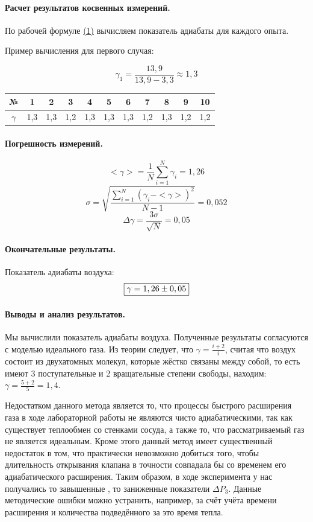 \documentclass{article}
\begin{document}
\paragraph{Расчет результатов косвенных измерений.}
	По рабочей формуле \hyperlink{formuls}{(1)} вычисляем показатель адиабаты для каждого опыта.
	
	Пример вычисления для первого случая:
	
	$$\gamma_1=\frac{13,9}{13,9-3,3}\approx1,3$$ 
	
		\begin{center}
		\begin{tabular}{c|c| c |c |c |c |c |c |c| c| c|  }
			№&1&2&3&4&5&6&7	&8&9&10\\
			\hline
			$\gamma$& 1,3 & 1,3& 1,2& 1,3& 1,3& 1,3& 1,2& 1,3& 1,2& 1,2
		\end{tabular}
	\end{center}
\paragraph{Погрешность измерений.}
$$<\gamma>=\frac{1}{N}\sum_{i=1}^{N}\gamma_i=1,26$$
$$\sigma=\sqrt{\frac{\sum_{i=1}^{N}(\gamma_i-<\gamma>)^2}{N-1}}=0,052$$
$$ \Delta\gamma=\frac{3\sigma}{\sqrt{N}}=0,05$$

 
\paragraph{Окончательные результаты.}
Показатель адиабаты воздуха:
$$\fbox{$\gamma=1,26\pm0,05$} $$
\paragraph{Выводы и анализ результатов.}
Мы вычислили показатель адиабаты воздуха. Полученные результаты согласуются с моделью идеального газа. Из теории следует, что  $\gamma=\frac{i+2}{i}$, считая что воздух состоит из двухатомных молекул, которые жёстко связаны между собой, то есть имеют 3 поступательные и 2 вращательные степени свободы, находим: $\gamma=\frac{5+2}{5}=1,4$.

Недостатком данного метода является то, что процессы быстрого расширения газа в ходе лабораторной работы не являются чисто адиабатическими, так как существует теплообмен со стенками сосуда, а также то, что рассматриваемый газ не является идеальным. Кроме этого данный метод имеет существенный недостаток в том, что практически невозможно добиться того, чтобы длительность открывания клапана в точности совпадала бы со временем его адиабатического расширения. Таким образом, в ходе эксперимента у нас получались то завышенные , то заниженные показатели $\Delta P_3$. Данные методические ошибки можно устранить, например, за счёт учёта времени расширения и количества подведённого за это время тепла.
\end{document}
